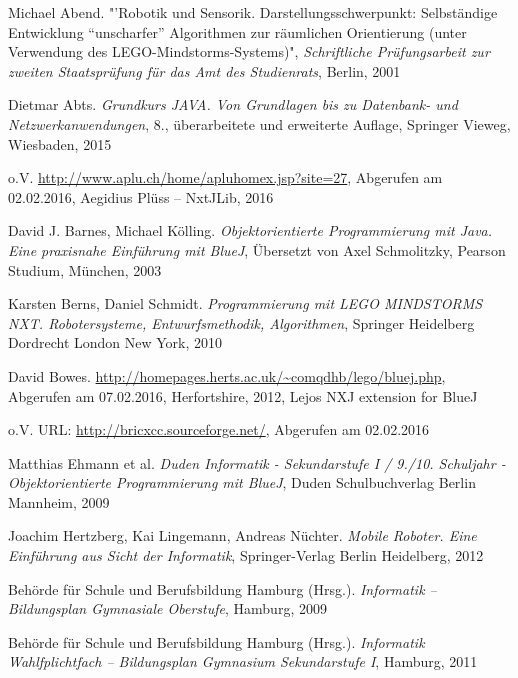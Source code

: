 \begin{thebibliography}{ABCDEF}

\renewcommand{\refname}{\normalsize Literaturverzeichnis}

Michael Abend. "'Robotik und Sensorik. Darstellungsschwerpunkt: Selbständige Entwicklung "`unscharfer"' Algorithmen zur räumlichen Orientierung (unter Verwendung des LEGO-Mindstorms-Systems)", \emph{Schriftliche Prüfungsarbeit zur zweiten Staatsprüfung für das Amt des Studienrats}, Berlin, 2001

Dietmar Abts. \emph{Grundkurs JAVA. Von Grundlagen bis zu Datenbank- und Netzwerkanwendungen}, 8., überarbeitete und erweiterte Auflage, Springer Vieweg, Wiesbaden, 2015

o.V. \url{http://www.aplu.ch/home/apluhomex.jsp?site=27}, Abgerufen am 02.02.2016, Aegidius Plüss -- NxtJLib, 2016

David J. Barnes, Michael Kölling. \emph{Objektorientierte Programmierung mit Java. Eine praxisnahe Einführung mit BlueJ}, Übersetzt von Axel Schmolitzky, Pearson Studium, München, 2003

\pagebreak 

Karsten Berns, Daniel Schmidt. \emph{Programmierung mit LEGO MINDSTORMS NXT. Robotersysteme, Entwurfsmethodik, Algorithmen}, Springer Heidelberg Dordrecht London New York, 2010

David Bowes. \url{http://homepages.herts.ac.uk/~comqdhb/lego/bluej.php}, Abgerufen am 07.02.2016, Herfortshire, 2012, Lejos NXJ extension for BlueJ

o.V. URL: \url{http://bricxcc.sourceforge.net/}, Abgerufen am 02.02.2016

Matthias Ehmann et al. \emph{Duden Informatik - Sekundarstufe I / 9./10. Schuljahr - Objektorientierte Programmierung mit BlueJ}, Duden Schulbuchverlag Berlin Mannheim, 2009

Joachim Hertzberg, Kai Lingemann, Andreas Nüchter. \emph{Mobile Roboter. Eine Einführung aus Sicht der Informatik}, Springer-Verlag Berlin Heidelberg, 2012

Behörde für Schule und Berufsbildung Hamburg (Hrsg.). \emph{Informatik -- Bildungsplan  Gymnasiale Oberstufe}, Hamburg, 2009

Behörde für Schule und Berufsbildung Hamburg (Hrsg.). \emph{Informatik Wahlfplichtfach -- Bildungsplan Gymnasium Sekundarstufe I}, Hamburg, 2011


\end{thebibliography}
